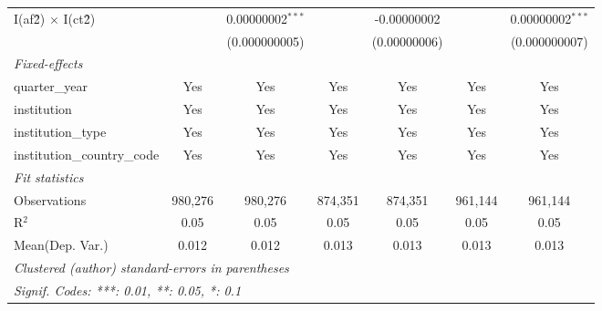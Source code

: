 \begin{tabular}{lcccccc}
   I(af\^2) $\times$ I(ct\^2)         &                & 0.00000002$^{***}$ &                & -0.00000002     &                & 0.00000002$^{***}$\\   
                                      &                & (0.000000005)      &                & (0.00000006)    &                & (0.000000007)\\   
   \midrule
   \emph{Fixed-effects}\\
   quarter\_year                      & Yes            & Yes                & Yes            & Yes             & Yes            & Yes\\  
   institution                        & Yes            & Yes                & Yes            & Yes             & Yes            & Yes\\  
   institution\_type                  & Yes            & Yes                & Yes            & Yes             & Yes            & Yes\\  
   institution\_country\_code         & Yes            & Yes                & Yes            & Yes             & Yes            & Yes\\  
   \midrule
   \emph{Fit statistics}\\
   Observations                       & 980,276        & 980,276            & 874,351        & 874,351         & 961,144        & 961,144\\  
   R$^2$                              & 0.05           & 0.05               & 0.05           & 0.05            & 0.05           & 0.05\\  
Mean(Dep. Var.) & 0.012 & 0.012 & 0.013 & 0.013 & 0.013 & 0.013 \\
   \midrule \midrule
   \multicolumn{7}{l}{\emph{Clustered (author) standard-errors in parentheses}}\\
   \multicolumn{7}{l}{\emph{Signif. Codes: ***: 0.01, **: 0.05, *: 0.1}}\\
\end{tabular}
\par\endgroup
